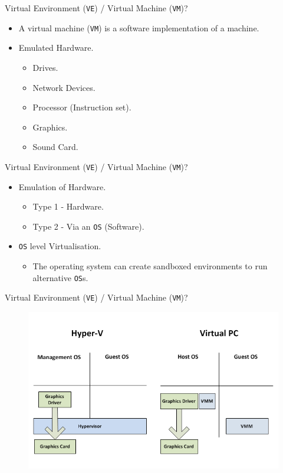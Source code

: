 \documentclass{beamer}
\begin{document}
\begin{frame}{Virtual Environment (\texttt{VE}) / Virtual Machine (\texttt{VM})?}
  \begin{itemize}
    \item A virtual machine (\texttt{VM}) is a software implementation of a machine.
    \item Emulated Hardware.
    \begin{itemize}
      \item Drives.
      \item Network Devices.
      \item Processor (Instruction set).
      \item Graphics.
      \item Sound Card.
    \end{itemize}  
  \end{itemize}
\end{frame}

\begin{frame}{Virtual Environment (\texttt{VE}) / Virtual Machine (\texttt{VM})?}
  \begin{itemize}
    \item Emulation of Hardware.
      \begin{itemize}
        \item Type 1 - Hardware.
        \item Type 2 - Via an \texttt{OS} (Software).
      \end{itemize}  
    \item \texttt{OS} level Virtualisation.
      \begin{itemize}
        \item The operating system can create sandboxed environments to run alternative \texttt{OS}s.
      \end{itemize}
  \end{itemize}
\end{frame}

\begin{frame}{Virtual Environment (\texttt{VE}) / Virtual Machine (\texttt{VM})?}
  \begin{figure}
    \begin{center}
      \includegraphics[width=\linewidth]{Comparison.png}
    \end{center}
  \end{figure}
\end{frame}
\end{document}
